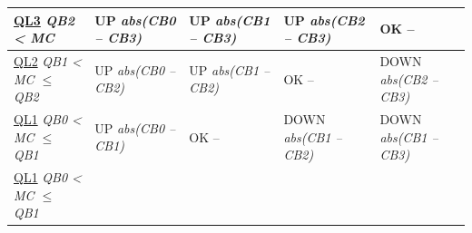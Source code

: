\begin{tabularx}
  {\textwidth}
  { X | X | X | X | X }
  \toprule
      \centering \hspace{4mm} \uline{QL3} \newline \footnotesize \textit{QB2 \textless{} MC} 
    & \centering \hspace{4mm} UP \newline \footnotesize \textit{abs(CB0 -- CB3)} 
    & \centering \hspace{4mm} UP \newline \footnotesize \textit{abs(CB1 -- CB3)} 
    & \centering \hspace{4mm} UP \newline \footnotesize \textit{abs(CB2 -- CB3)} 
    & \centering \hspace{4mm} OK \newline -- 
    \tabularnewline
  \hline
      \centering \hspace{4mm} \uline{QL2} \newline \footnotesize \textit{QB1 \textless{} MC $\leq$ QB2} 
    & \centering \hspace{4mm} UP \newline \footnotesize \textit{abs(CB0 -- CB2)} 
    & \centering \hspace{4mm} UP \newline \footnotesize \textit{abs(CB1 -- CB2)} 
    & \centering \hspace{4mm} OK \newline -- 
    & \centering \hspace{4mm} DOWN \newline \footnotesize \textit{abs(CB2 -- CB3)} 
    \tabularnewline
  \hline
      \centering \hspace{4mm} \uline{QL1} \newline \footnotesize \textit{QB0 \textless{} MC $\leq$ QB1} 
    & \centering \hspace{4mm} UP \newline \footnotesize \textit{abs(CB0 -- CB1)} 
    & \centering \hspace{4mm} OK \newline -- 
    & \centering \hspace{4mm} DOWN \newline \footnotesize \textit{abs(CB1 -- CB2)} 
    & \centering \hspace{4mm} DOWN \newline \footnotesize \textit{abs(CB1 -- CB3)} 
    \tabularnewline
  \hline
      \centering \hspace{4mm} \uline{QL1} \newline \footnotesize \textit{QB0 \textless{} MC $\leq$ QB1} 

\end{tabularx}
